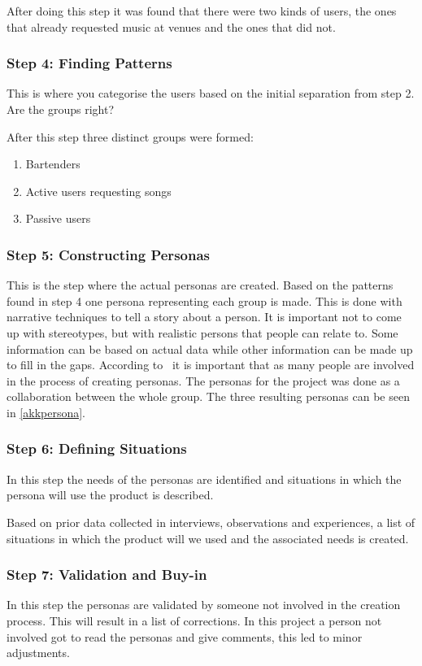 After doing this step it was found that there were two kinds of users, the ones that already requested music at venues and the ones that did not.

\subsubsection{Step 4: Finding Patterns}
This is where you categorise the users based on the initial separation from step 2. Are the groups right?

After this step three distinct groups were formed:
\begin{enumerate}
    \item Bartenders
    \item Active users requesting songs
    \item Passive users
\end{enumerate}

\subsubsection{Step 5: Constructing Personas}
This is the step where the actual personas are created. Based on the patterns found in step 4 one persona representing each group is made. This is done with narrative techniques to tell a story about a person. It is important not to come up with stereotypes, but with realistic persons that people can relate to. Some information can be based on actual data while other information can be made up to fill in the gaps. According to~\cite{lene2007persona} it is important that as many people are involved in the process of creating personas. The personas for the project was done as a collaboration between the whole group. The three resulting personas can be seen in \cref{akkpersona}.

\subsubsection{Step 6: Defining Situations}
In this step the needs of the personas are identified and situations in which the persona will use the product is described.

Based on prior data collected in interviews, observations and experiences, a list of situations in which the product will we used and the associated needs is created.

\subsubsection{Step 7: Validation and Buy-in}
In this step the personas are validated by someone not involved in the creation process. This will result in a list of corrections. In this project a person not involved got to read the personas and give comments, this led to minor adjustments.

